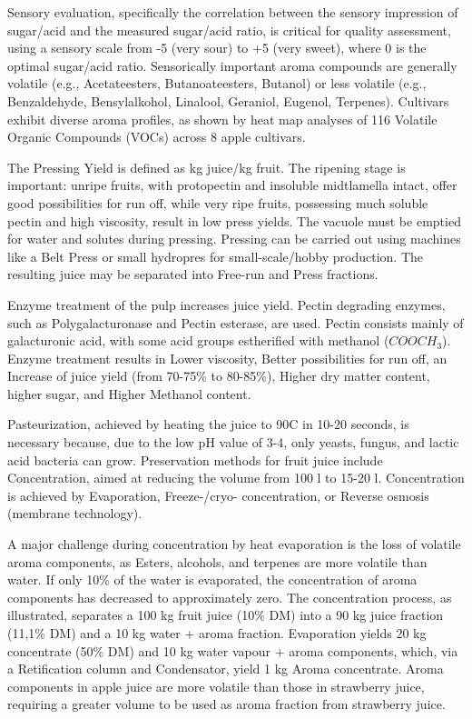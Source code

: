 \vspace{0.5em}
Sensory evaluation, specifically the correlation between the sensory impression of sugar/acid and the measured sugar/acid ratio, is critical for quality assessment, using a sensory scale from -5 (very sour) to +5 (very sweet), where 0 is the optimal sugar/acid ratio. Sensorically important aroma compounds are generally volatile (e.g., Acetateesters, Butanoateesters, Butanol) or less volatile (e.g., Benzaldehyde, Bensylalkohol, Linalool, Geraniol, Eugenol, Terpenes). Cultivars exhibit diverse aroma profiles, as shown by heat map analyses of 116 Volatile Organic Compounds (VOCs) across 8 apple cultivars.

\vspace{0.5em}
The Pressing Yield is defined as kg juice/kg fruit. The ripening stage is important: unripe fruits, with protopectin and insoluble midtlamella intact, offer good possibilities for run off, while very ripe fruits, possessing much soluble pectin and high viscosity, result in low press yields. The vacuole must be emptied for water and solutes during pressing. Pressing can be carried out using machines like a Belt Press or small hydropres for small-scale/hobby production. The resulting juice may be separated into Free-run and Press fractions.

\vspace{0.5em}
Enzyme treatment of the pulp increases juice yield. Pectin degrading enzymes, such as Polygalacturonase and Pectin esterase, are used. Pectin consists mainly of galacturonic acid, with some acid groups estherified with methanol ($COOCH_3$). Enzyme treatment results in Lower viscosity, Better possibilities for run off, an Increase of juice yield (from 70-75\% to 80-85\%), Higher dry matter content, higher sugar, and Higher Methanol content.

\vspace{0.5em}
Pasteurization, achieved by heating the juice to 90\textdegree C in 10-20 seconds, is necessary because, due to the low pH value of 3-4, only yeasts, fungus, and lactic acid bacteria can grow. Preservation methods for fruit juice include Concentration, aimed at reducing the volume from 100 l to 15-20 l. Concentration is achieved by Evaporation, Freeze-/cryo- concentration, or Reverse osmosis (membrane technology).

\vspace{0.5em}
A major challenge during concentration by heat evaporation is the loss of volatile aroma components, as Esters, alcohols, and terpenes are more volatile than water. If only 10\% of the water is evaporated, the concentration of aroma components has decreased to approximately zero. The concentration process, as illustrated, separates a 100 kg fruit juice (10\% DM) into a 90 kg juice fraction (11,1\% DM) and a 10 kg water + aroma fraction. Evaporation yields 20 kg concentrate (50\% DM) and 10 kg water vapour + aroma components, which, via a Retification column and Condensator, yield 1 kg Aroma concentrate. Aroma components in apple juice are more volatile than those in strawberry juice, requiring a greater volume to be used as aroma fraction from strawberry juice.

